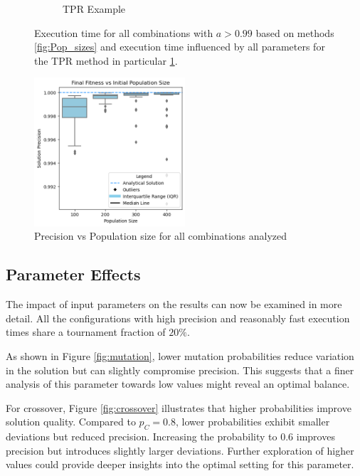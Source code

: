\documentclass[11pt,a4paper,twoside]{article}
\begin{document}
\begin{figure}[H]
\begin{subfigure}[b]{0.45\textwidth}
        \caption{TPR Example}
        \label{fig:TPR_ex}
    \end{subfigure}
    \caption{Execution time for all combinations with $a>0.99$ based on methods \ref{fig:Pop_sizes} and execution time influenced by all parameters for the TPR method in particular \ref{fig:TPR_ex}.}
    \label{fig:comparison}
\end{figure}

\begin{figure}[H]
    \centering
    \includegraphics[width=0.5\textwidth]{precision_vs_pop.png}
    \caption{Precision vs Population size for all combinations analyzed}
    \label{fig:precision}
\end{figure}

\subsection{Parameter Effects}

The impact of input parameters on the results can now be examined in more detail. All the configurations with high precision and reasonably fast execution times share a tournament fraction of $20\%$.

As shown in Figure \ref{fig:mutation}, lower mutation probabilities reduce variation in the solution but can slightly compromise precision. This suggests that a finer analysis of this parameter towards low values might reveal an optimal balance.

For crossover, Figure \ref{fig:crossover} illustrates that higher probabilities improve solution quality. Compared to $p_C = 0.8$, lower probabilities exhibit smaller deviations but reduced precision. Increasing the probability to $0.6$ improves precision but introduces slightly larger deviations. Further exploration of higher values could provide deeper insights into the optimal setting for this parameter.
\end{document}
